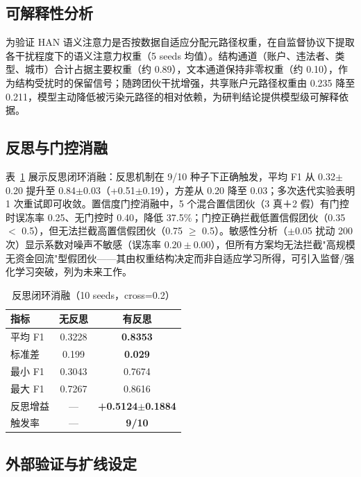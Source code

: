 \documentclass[12pt,a4paper,fontset=windows]{ctexart}
\begin{document}
\subsection{可解释性分析}

为验证 HAN 语义注意力是否按数据自适应分配元路径权重，在自监督协议下提取各干扰程度下的语义注意力权重（5 seeds 均值）。结构通道（账户、违法者、类型、城市）合计占据主要权重（约 0.89），文本通道保持非零权重（约 0.10），作为结构受扰时的保留信号；随跨团伙干扰增强，共享账户元路径权重由 0.235 降至 0.211，模型主动降低被污染元路径的相对依赖，为研判结论提供模型级可解释依据。

\subsection{反思与门控消融}

表~\ref{tab:reflection} 展示反思闭环消融：反思机制在 9/10 种子下正确触发，平均 F1 从 0.32$\pm$0.20 提升至 0.84$\pm$0.03（+0.51$\pm$0.19），方差从 0.20 降至 0.03；多次迭代实验表明 1 次重试即可收敛。置信度门控消融中，5 个混合置信团伙（3 真＋2 假）有门控时误冻率 0.25、无门控时 0.40，降低 37.5\%；门控正确拦截低置信假团伙（0.35 $<$ 0.5），但无法拦截高置信假团伙（0.75 $\ge$ 0.5）。敏感性分析（$\pm$0.05 扰动 200 次）显示系数对噪声不敏感（误冻率 $0.20\pm0.00$），但所有方案均无法拦截"高规模无资金回流"型假团伙——其由权重结构决定而非自适应学习所得，可引入监督/强化学习突破，列为未来工作。

\begin{table}[H]
  \centering
  \caption{反思闭环消融（10 seeds，cross=0.2）}
  \label{tab:reflection}
  \begin{tabular}{lcc}
    \toprule
    指标 & 无反思 & 有反思 \\
    \midrule
    平均 F1 & 0.3228 & \textbf{0.8353} \\
    标准差 & 0.199 & \textbf{0.029} \\
    最小 F1 & 0.3043 & 0.7674 \\
    最大 F1 & 0.7267 & 0.8616 \\
    反思增益 & --- & \textbf{+0.5124$\pm$0.1884} \\
    触发率 & --- & \textbf{9/10} \\
    \bottomrule
  \end{tabular}
\end{table}

\subsection{外部验证与扩线设定}
\end{document}
